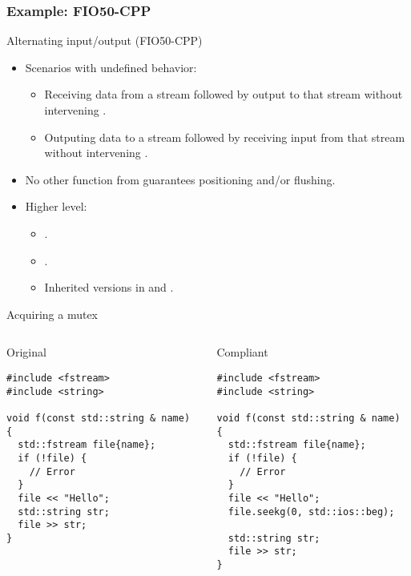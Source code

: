 \subsubsection{Example: FIO50-CPP}

\begin{frame}[t]{Alternating input/output (FIO50-CPP)}
\begin{itemize}
  \item Scenarios with undefined behavior:
    \begin{itemize}
      \item Receiving data from a stream followed by output to that stream
            without intervening .
      \item Outputing data to a stream followed by receiving input from that stream
            without intervening .
    \end{itemize}

  \vfill
  \item No other function from  guarantees positioning
        and/or flushing.

  \vfill
  \item Higher level:
    \begin{itemize}
      \item {}.
      \item {}.
      \item Inherited versions in  and .
    \end{itemize}
\end{itemize}
\end{frame}

\begin{frame}[t,fragile]{Acquiring a mutex}
\begin{columns}

\begin{block}{Original}
\begin{lstlisting}
#include <fstream>
#include <string>

void f(const std::string & name) {
  std::fstream file{name};
  if (!file) {
    // Error
  }
  file << "Hello";
  std::string str;
  file >> str;
}
\end{lstlisting}
\end{block}

\pause
{}
\begin{block}{Compliant}
\begin{lstlisting}[escapechar=@]
#include <fstream>
#include <string>

void f(const std::string & name) {
  std::fstream file{name};
  if (!file) {
    // Error
  }
  file << "Hello";
  file.seekg(0, std::ios::beg);

  std::string str;
  file >> str;
}
\end{lstlisting}
\end{block}

\end{columns}
\end{frame}

